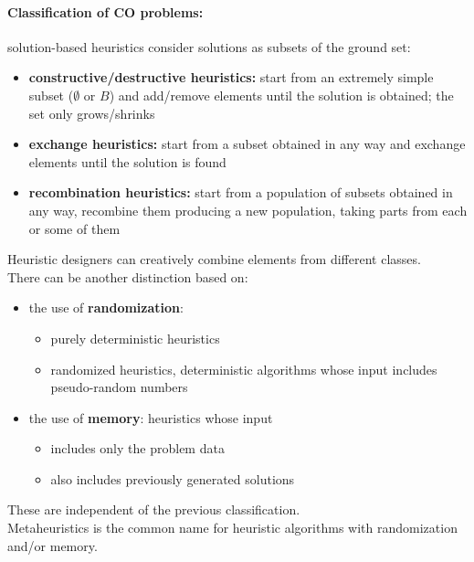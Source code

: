 \newpage

\paragraph{Classification of CO problems:} solution-based heuristics consider solutions as subsets of the ground set: 
\begin{itemize}
	\item \textbf{constructive/destructive heuristics:} start from an extremely simple subset ($\emptyset$ or $B$) and add/remove elements until the solution is obtained; the set only grows/shrinks
	\item \textbf{exchange heuristics:} start from a subset obtained in any way and exchange elements until the solution is found
	\item \textbf{recombination heuristics:} start from a population of subsets obtained in any way, recombine them producing a new population, taking parts from each or some of them
\end{itemize}
Heuristic designers can creatively combine elements from different classes.\\

There can be another distinction based on: 
\begin{itemize}
	\item the use of \textbf{randomization}: 
	\begin{itemize}
		\item purely deterministic heuristics
		\item randomized heuristics, deterministic algorithms whose input includes pseudo-random numbers
	\end{itemize}
	\item the use of \textbf{memory}: heuristics whose input
	\begin{itemize}
		\item includes only the problem data 
		\item also includes previously generated solutions
	\end{itemize}
\end{itemize}
These are independent of the previous classification.\\
Metaheuristics is the common name for heuristic algorithms with randomization and/or memory.\\

\newpage

